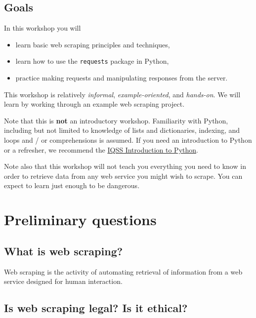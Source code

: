 \documentclass[]{book}
\providecommand{\tightlist}{%
  \setlength{\itemsep}{0pt}\setlength{\parskip}{0pt}}
\begin{document}
\subsection{Goals}\label{goals-5}

In this workshop you will

\begin{itemize}
\tightlist
\item
  learn basic web scraping principles and techniques,
\item
  learn how to use the \texttt{requests} package in Python,
\item
  practice making requests and manipulating responses from the server.
\end{itemize}

This workshop is relatively \emph{informal}, \emph{example-oriented},
and \emph{hands-on}. We will learn by working through an example web
scraping project.

Note that this is \textbf{not} an introductory workshop. Familiarity
with Python, including but not limited to knowledge of lists and
dictionaries, indexing, and loops and / or comprehensions is assumed. If
you need an introduction to Python or a refresher, we recommend the
\href{https://dss.iq.harvard.edu/workshop-materials\#widget-0}{IQSS
Introduction to Python}.

Note also that this workshop will not teach you everything you need to
know in order to retrieve data from any web service you might wish to
scrape. You can expect to learn just enough to be dangerous.

\section{Preliminary questions}\label{preliminary-questions}

\subsection{What is web scraping?}\label{what-is-web-scraping}

Web scraping is the activity of automating retrieval of information from
a web service designed for human interaction.

\subsection{Is web scraping legal? Is it
ethical?}\label{is-web-scraping-legal-is-it-ethical}
\end{document}
